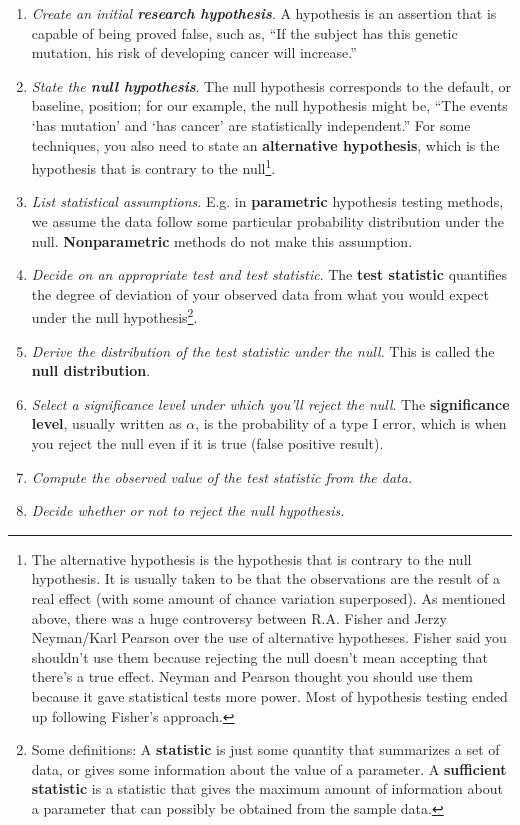 \begin{enumerate}
\item \textit{Create an initial \textbf{research hypothesis}}. A hypothesis is an assertion that is capable of being proved false, such as, ``If the subject has this genetic mutation, his risk of developing cancer will increase.''
\item \textit{State the \textbf{null hypothesis}}. The null hypothesis corresponds to the default, or baseline, position; for our example, the null hypothesis might be, ``The events `has mutation' and `has cancer' are statistically independent.'' For some techniques, you also need to state an \textbf{alternative hypothesis}, which is the hypothesis that is contrary to the null\footnote{The alternative hypothesis is the hypothesis that is contrary to the null hypothesis. It is usually taken to be that the observations are the result of a real effect (with some amount of chance variation superposed). As mentioned above, there was a huge controversy between R.A. Fisher and Jerzy Neyman/Karl Pearson over the use of alternative hypotheses. Fisher said you shouldn't use them because rejecting the null doesn't mean accepting that there's a true effect. Neyman and Pearson thought you should use them because it gave statistical tests more power. Most of hypothesis testing ended up following Fisher's approach.}. 
\item \textit{List statistical {assumptions}}. E.g. in \textbf{parametric} hypothesis testing methods, we assume the data follow some particular probability distribution under the null. \textbf{Nonparametric} methods do not make this assumption.
\item \textit{Decide on an appropriate test and test statistic}. The \textbf{test statistic} quantifies the degree of deviation of your observed data from what you would expect under the null hypothesis\footnote{Some definitions: A \textbf{statistic} is just some quantity that summarizes a set of data, or gives some information about the value of a parameter. A \textbf{sufficient statistic} is a statistic that gives the maximum amount of information about a parameter that can possibly be obtained from the sample data.}. 
\item \textit{Derive the distribution of the test statistic under the null}. This is called the \textbf{null distribution}.
\item \textit{Select a {significance level} under which you'll reject the null}. The \textbf{significance level}, usually written as $\alpha$, is the probability of a type I error, which is when you reject the null even if it is true (false positive result). 
\item \textit{Compute the observed value of the test statistic from the data.}
\item \textit{Decide whether or not to reject the null hypothesis.}
\end{enumerate}

